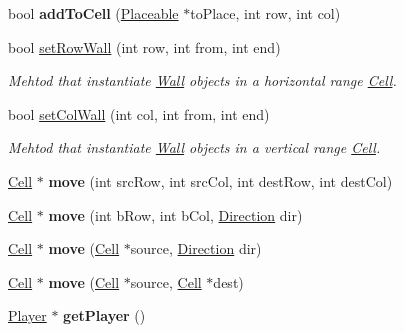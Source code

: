 \begin{DoxyCompactItemize}
\hypertarget{class_map_a9f10c89830337667bc392e3814b5e616}{}\label{class_map_a9f10c89830337667bc392e3814b5e616} 
bool {\bfseries add\+To\+Cell} (\hyperlink{class_placeable}{Placeable} $\ast$to\+Place, int row, int col)
\item 
bool \hyperlink{class_map_a7b5c1d8ed873a72484f27e99bcdff97a}{set\+Row\+Wall} (int row, int from, int end)
\begin{DoxyCompactList}\small\item\em Mehtod that instantiate \hyperlink{class_wall}{Wall} objects in a horizontal range \hyperlink{class_cell}{Cell}. \end{DoxyCompactList}\item 
bool \hyperlink{class_map_a7e89d11a89a796ac46e60722533f23d4}{set\+Col\+Wall} (int col, int from, int end)
\begin{DoxyCompactList}\small\item\em Mehtod that instantiate \hyperlink{class_wall}{Wall} objects in a vertical range \hyperlink{class_cell}{Cell}. \end{DoxyCompactList}\item 
\hypertarget{class_map_aaf124535e6f73756eb345c0c2729318e}{}\label{class_map_aaf124535e6f73756eb345c0c2729318e} 
\hyperlink{class_cell}{Cell} $\ast$ {\bfseries move} (int src\+Row, int src\+Col, int dest\+Row, int dest\+Col)
\item 
\hypertarget{class_map_a18ed9496bb0cd446cef68f96cc63e626}{}\label{class_map_a18ed9496bb0cd446cef68f96cc63e626} 
\hyperlink{class_cell}{Cell} $\ast$ {\bfseries move} (int b\+Row, int b\+Col, \hyperlink{class_direction}{Direction} dir)
\item 
\hypertarget{class_map_a88ec7e2175681e74c48d1684ff4753a0}{}\label{class_map_a88ec7e2175681e74c48d1684ff4753a0} 
\hyperlink{class_cell}{Cell} $\ast$ {\bfseries move} (\hyperlink{class_cell}{Cell} $\ast$source, \hyperlink{class_direction}{Direction} dir)
\item 
\hypertarget{class_map_a006f7d493b6679cf0e6a9eab9ed00e73}{}\label{class_map_a006f7d493b6679cf0e6a9eab9ed00e73} 
\hyperlink{class_cell}{Cell} $\ast$ {\bfseries move} (\hyperlink{class_cell}{Cell} $\ast$source, \hyperlink{class_cell}{Cell} $\ast$dest)
\item 
\hypertarget{class_map_a18246b65a8f794b5620e523524fdb8e7}{}\label{class_map_a18246b65a8f794b5620e523524fdb8e7} 
\hyperlink{class_player}{Player} $\ast$ {\bfseries get\+Player} ()
\item 
\hypertarget{class_map_ad1af1c1145fbc4675952fa10c0aacf61}{}\label{class_map_ad1af1c1145fbc4675952fa10c0aacf61} 

\end{DoxyCompactItemize}
